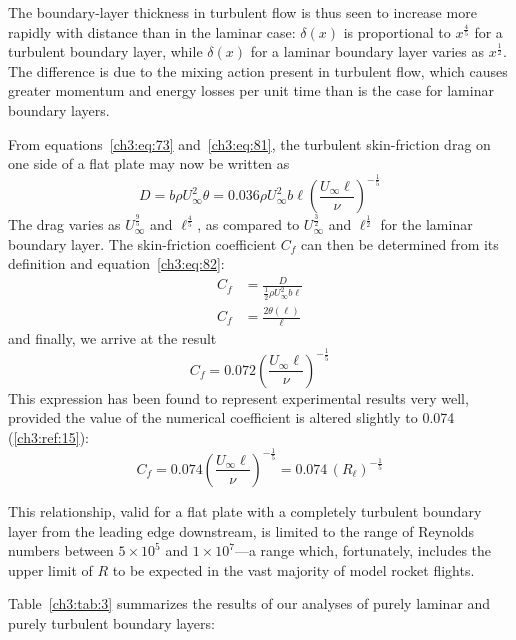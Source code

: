 The boundary-layer thickness in turbulent flow is thus
seen to increase more rapidly with distance than in the laminar
case: $\delta(x)$ is proportional to $x^{\frac{4}{5}}$ for a turbulent boundary
layer, while $\delta(x)$ for a laminar boundary layer varies as
$x^{\frac{1}{2}}$. The difference is due to the mixing action present in
turbulent flow, which causes greater momentum and energy losses
per unit time than is the case for laminar boundary layers.

From equations~\eqref{ch3:eq:73} and~\eqref{ch3:eq:81}, the turbulent skin-friction
drag on one side of a flat plate may now be written as
\begin{equation}\label{ch3:eq:82}
D = b\rho U_\infty^{2}\theta = 0.036\rho U_\infty^{2}b\ell\left(\frac{U_\infty\ell}{\nu}\right)^{-\frac{1}{5}}
\end{equation}
The drag varies as $U_\infty^{\frac{9}{5}}$ and $\ell^{\frac{4}{5}}$, as compared to $U_\infty^{\frac{3}{2}}$ and $\ell^{\frac{1}{2}}$
for the laminar boundary layer. The skin-friction coefficient
$C_f$ can then be determined from its definition and equation~\eqref{ch3:eq:82}:
\begin{align}
C_f &= \frac{D}{\tfrac{1}{2}\rho U_\infty^{2}b\ell} \label{ch3:eq:83}\\
C_f &= \frac{2\theta(\ell)}{\ell} \label{ch3:eq:84}
\end{align}
and finally, we arrive at the result
\begin{equation}\label{ch3:eq:85}
C_f = 0.072\left(\frac{U_\infty\ell}{\nu}\right)^{-\frac{1}{5}}
\end{equation}
This expression has been found to represent experimental results
very well, provided the value of the numerical coefficient is
altered slightly to 0.074 (\ref{ch3:ref:15}):
\begin{equation}\label{ch3:eq:86}
C_f = 0.074\left(\frac{U_\infty\ell}{\nu}\right)^{-\frac{1}{5}} = 0.074\,(R_\ell)^{-\frac{1}{5}}
\end{equation}

This relationship, valid for a flat plate with a completely
turbulent boundary layer from the leading edge downstream, is
limited to the range of Reynolds numbers between $5 \times 10^{5}$ and
$1 \times 10^{7}$---a range which, fortunately, includes the upper limit
of $R$ to be expected in the vast majority of model rocket flights.

Table~\ref{ch3:tab:3} summarizes the results of our analyses of purely
laminar and purely turbulent boundary layers:

